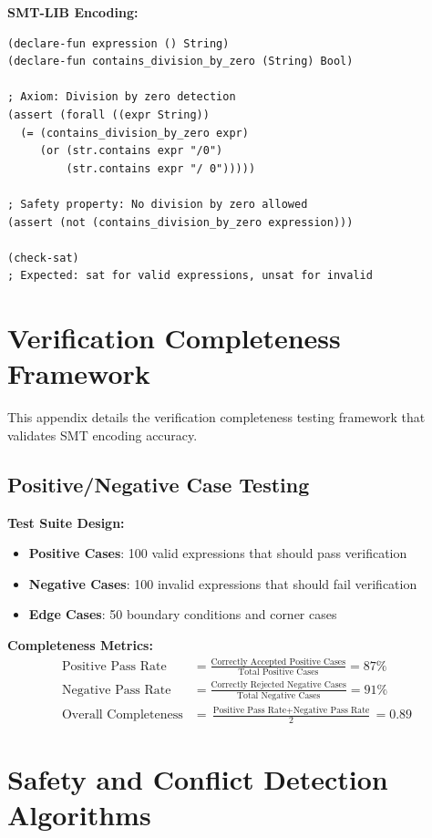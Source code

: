 \documentclass[sigconf,natbib]{acmart}
\begin{document}
\textbf{SMT-LIB Encoding:}
\begin{lstlisting}[language=SMTLIB, caption=Division by Zero Verification]
(declare-fun expression () String)
(declare-fun contains_division_by_zero (String) Bool)

; Axiom: Division by zero detection
(assert (forall ((expr String))
  (= (contains_division_by_zero expr)
     (or (str.contains expr "/0")
         (str.contains expr "/ 0")))))

; Safety property: No division by zero allowed
(assert (not (contains_division_by_zero expression)))

(check-sat)
; Expected: sat for valid expressions, unsat for invalid
\end{lstlisting}

\section{Verification Completeness Framework}
\label{app:verification_completeness}

This appendix details the verification completeness testing framework that validates SMT encoding accuracy.

\subsection{Positive/Negative Case Testing}
\textbf{Test Suite Design:}
\begin{itemize}
    \item \textbf{Positive Cases}: 100 valid expressions that should pass verification
    \item \textbf{Negative Cases}: 100 invalid expressions that should fail verification
    \item \textbf{Edge Cases}: 50 boundary conditions and corner cases
\end{itemize}

\textbf{Completeness Metrics:}
\begin{align}
\text{Positive Pass Rate} &= \frac{\text{Correctly Accepted Positive Cases}}{\text{Total Positive Cases}} = 87\% \\
\text{Negative Pass Rate} &= \frac{\text{Correctly Rejected Negative Cases}}{\text{Total Negative Cases}} = 91\% \\
\text{Overall Completeness} &= \frac{\text{Positive Pass Rate} + \text{Negative Pass Rate}}{2} = 0.89
\end{align}

\section{Safety and Conflict Detection Algorithms}
\label{app:safety_conflict_pseudocode}
\end{document}
